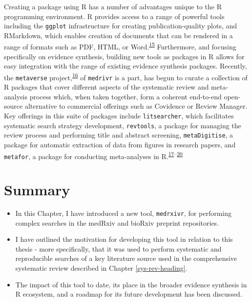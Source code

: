 \documentclass[a4paper, twoside]{templates/ociamthesis}
\begin{document}
Creating a package using R has a number of advantages unique to the R programming environment. R provides access to a range of powerful tools including the \texttt{ggplot} infrastructure for creating publication-quality plots, and RMarkdown, which enables creation of documents that can be rendered in a range of formats such as PDF, HTML, or Word.\textsuperscript{\protect\hyperlink{ref-xie2018r}{15}} Furthermore, and focusing specifically on evidence synthesis, building new tools as packages in R allows for easy integration with the range of existing evidence synthesis packages. Recently, the \texttt{metaverse} project,\textsuperscript{\protect\hyperlink{ref-variousauthors2020}{16}} of \texttt{medrivr} is a part, has begun to curate a collection of R packages that cover different aspects of the systematic review and meta-analysis process which, when taken together, form a coherent end-to-end open-source alternative to commercial offerings such as Covidence or Review Manager. Key offerings in this suite of packages include \texttt{litsearcher}, which facilitates systematic search strategy development, \texttt{revtools}, a package for managing the review process and performing title and abstract screening, \texttt{metaDigitise}, a package for automatic extraction of data from figures in research papers, and \texttt{metafor}, a package for conducting meta-analyses in R.\textsuperscript{\protect\hyperlink{ref-grames2019automated}{17}--\protect\hyperlink{ref-westgate2019revtools}{20}}

\hypertarget{summary-2}{%
\section{Summary}\label{summary-2}}

\begin{itemize}
\item
  In this Chapter, I have introduced a new tool, \texttt{medrxivr}, for performing complex searches in the medRxiv and bioRxiv preprint repositories.
\item
  I have outlined the motivation for developing this tool in relation to this thesis - more specifically, that it was used to perform systematic and reproducible searches of a key literature source used in the comprehensive systematic review described in Chapter \ref{sys-rev-heading}.
\item
  The impact of this tool to date, its place in the broader evidence synthesis in R ecosystem, and a roadmap for its future development has been discussed.
\end{itemize}
\end{document}
